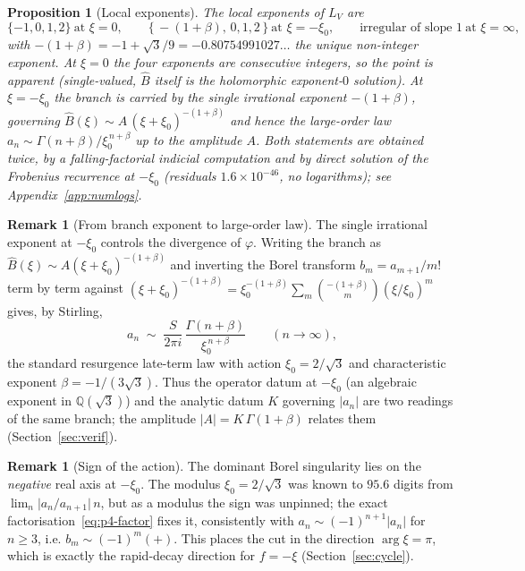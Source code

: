 \documentclass[11pt,reqno]{amsart}
\theoremstyle{plain}
\newtheorem{proposition}[theorem]{Proposition}
\theoremstyle{definition}
\newtheorem{remark}[theorem]{Remark}
\newcommand{\Bhat}{\widehat{B}}
\newcommand{\LV}{L_{V}}
\newcommand{\Qsqrt}{\mathbb{Q}(\sqrt3)}
\newcommand{\xizero}{\xi_0}
\begin{document}
\begin{proposition}[Local exponents]\label{prop:exponents}
The local exponents of $\LV$ are
\[
  \{-1,0,1,2\}\ \text{at } \xi=0,\qquad
  \{\,-(1+\beta),\,0,1,2\,\}\ \text{at } \xi=-\xizero,\qquad
  \text{irregular of slope }1\ \text{at } \xi=\infty,
\]
with $-(1+\beta)=-1+\sqrt3/9=-0.80754991027\ldots$ the unique non-integer exponent. At $\xi=0$
the four exponents are consecutive integers, so the point is \emph{apparent} (single-valued, $\Bhat$
itself is the holomorphic exponent-$0$ solution). At $\xi=-\xizero$ the branch is carried by the
single irrational exponent $-(1+\beta)$, governing $\Bhat(\xi)\sim A\,(\xi+\xizero)^{-(1+\beta)}$
and hence the large-order law $a_n\sim \Gamma(n+\beta)/\xizero^{\,n+\beta}$ up to the amplitude
$A$. Both statements are obtained twice, by a falling-factorial indicial computation and by direct
solution of the Frobenius recurrence at $-\xizero$ (residuals $1.6\times10^{-46}$, no
logarithms); see Appendix~\ref{app:numlogs}.
\end{proposition}

\begin{remark}[From branch exponent to large-order law]\label{rmk:largeorder}
The single irrational exponent at $-\xizero$ controls the divergence of $\varphi$. Writing the
branch as $\Bhat(\xi)\sim A(\xi+\xizero)^{-(1+\beta)}$ and inverting the Borel transform
$b_m=a_{m+1}/m!$ term by term against $(\xi+\xizero)^{-(1+\beta)}=\xizero^{-(1+\beta)}\sum_m
\binom{-(1+\beta)}{m}(\xi/\xizero)^m$ gives, by Stirling,
\begin{equation}\label{eq:largeorder}
  a_n\;\sim\;\frac{S}{2\pi i}\,\frac{\Gamma(n+\beta)}{\xizero^{\,n+\beta}}\qquad(n\to\infty),
\end{equation}
the standard resurgence late-term law with action $\xizero=2/\sqrt3$ and characteristic exponent
$\beta=-1/(3\sqrt3)$. Thus the operator datum at $-\xizero$ (an algebraic exponent in $\Qsqrt$)
and the analytic datum $K$ governing $\lvert a_n\rvert$ are two readings of the same branch; the
amplitude $\lvert A\rvert=K\,\Gamma(1+\beta)$ relates them (Section~\ref{sec:verif}).
\end{remark}

\begin{remark}[Sign of the action]
The dominant Borel singularity lies on the \emph{negative} real axis at $-\xizero$. The modulus
$\xizero=2/\sqrt3$ was known to $95.6$ digits from $\lim_n\lvert a_n/a_{n+1}\rvert\,n$, but as a
modulus the sign was unpinned; the exact factorisation~\eqref{eq:p4-factor} fixes it, consistently
with $a_n\sim(-1)^{n+1}\lvert a_n\rvert$ for $n\ge3$, i.e. $b_m\sim(-1)^m(+)$. This places the cut
in the direction $\arg\xi=\pi$, which is exactly the rapid-decay direction for $f=-\xi$
(Section~\ref{sec:cycle}).
\end{remark}
\end{document}
